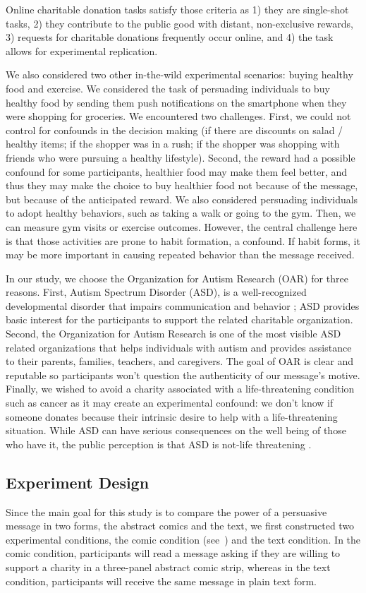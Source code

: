 Online charitable donation tasks satisfy those criteria as 1) they are single-shot tasks, 2) they contribute to the public good with distant, non-exclusive rewards, 3) requests for charitable donations frequently occur online, and 4) the task allows for experimental replication. 


We also considered two other in-the-wild experimental scenarios: buying healthy food and exercise. We considered the task of persuading individuals to buy healthy food by sending them push notifications on the smartphone when they were shopping for groceries. We encountered two challenges. First, we could not control for confounds in the decision making (if there are discounts on salad / healthy items; if the shopper was in a rush; if the shopper was shopping with friends who were pursuing a healthy lifestyle). Second, the reward had a possible confound for some participants, healthier food may make them feel better, and thus they may make the choice to buy healthier food not because of the message, but because of the anticipated reward. We also considered persuading individuals to adopt healthy behaviors, such as taking a walk or going to the gym. Then, we can measure gym visits or exercise outcomes. However, the central challenge here is that those activities are prone to habit formation, a confound. If habit forms, it may be more important in causing repeated behavior than the message received.

In our study, we choose the Organization for Autism Research (OAR) for three reasons. First, Autism Spectrum Disorder (ASD), is a well-recognized developmental disorder that impairs communication and behavior \cite{american2013diagnostic}; ASD provides basic interest for the participants to support the related charitable organization. Second, the Organization for Autism Research is one of the most visible ASD related organizations that helps individuals with autism and provides assistance to their parents, families, teachers, and caregivers. The goal of OAR is clear and reputable so participants won't question the authenticity of our message's motive. Finally, we wished to avoid a charity associated with a life-threatening condition such as cancer as it may create an experimental confound: we don't know if someone donates because their intrinsic desire to help with a life-threatening situation. While ASD can have serious consequences on the well being of those who have it, the public perception is that ASD is not-life threatening \cite{american2013diagnostic}. 


\subsection{Experiment Design}
\label{sub:Experiment Design}
Since the main goal for this study is to compare the power of a persuasive message in two forms, the abstract comics and the text, we first constructed two experimental conditions, the comic condition (see~) and the text condition. In the comic condition, participants will read a message asking if they are willing to support a charity in a three-panel abstract comic strip, whereas in the text condition, participants will receive the same message in plain text form. 

